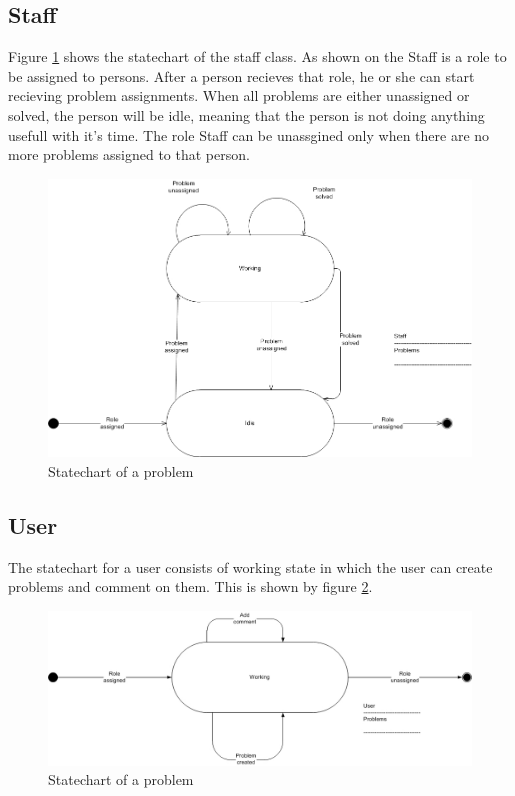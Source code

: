 \subsection{Staff}
Figure \ref{fig:Klasse_diagram_staff} shows the statechart of the staff class. As shown on the Staff is a role to be assigned to persons. After a person recieves that role, he or she can start recieving problem assignments. When all problems are either unassigned or solved, the person will be idle, meaning that the person is not doing anything usefull with it's time. The role Staff can be unassgined only when there are no more problems assigned to that person.
\begin{figure}[H]
\begin{center}
\includegraphics[width=1\textwidth]{input/problem_domain_analysis/Klassediagram_staff.jpg}
\caption{Statechart of a problem}
\label{fig:Klasse_diagram_staff}
\end{center}
\end{figure}

\subsection{User}
The statechart for a user consists of working state in which the user can create problems and comment on them. This is shown by figure \ref{fig:Klasse_diagram_user}.
\begin{figure}[H]
\begin{center}
\includegraphics[width=1\textwidth]{input/problem_domain_analysis/Klassediagram_user.jpg}
\caption{Statechart of a problem}
\label{fig:Klasse_diagram_user}
\end{center}
\end{figure}

